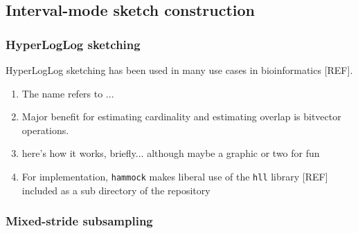 \documentclass[11pt]{article}
\newcommand{\program}[1]{\texttt{#1}}
\begin{document}
\subsection{Interval-mode sketch construction}
\subsubsection{HyperLogLog sketching}
HyperLogLog sketching has been used in many use cases in bioinformatics [REF].
\begin{enumerate}
\item The name refers to ...
    \item Major benefit for estimating cardinality and estimating overlap is bitvector operations.
    \item here's how it works, briefly... although maybe a graphic or two for fun
    \item For implementation, \program{hammock} makes liberal use of the \program{hll} library [REF] included as a sub directory of the repository
\end{enumerate}
\subsubsection{Mixed-stride subsampling}





\end{document}
